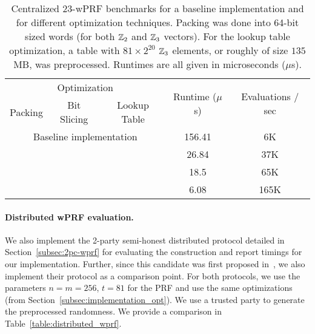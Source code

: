 \begin{table}[t]
	{
		\centering
		\begin{tabular}{|c|c|c|c|c|}
			
			\hline
			\multicolumn{3}{|c|}{Optimization} &  \multirow{2}{*}{Runtime ($\mu$s)} & \multirow{2}{*}{Evaluations / sec} \\
			Packing & Bit Slicing & Lookup Table &  & \\
			\hline\hline
			\multicolumn{3}{|c|}{Baseline implementation} & 156.41 & 6K\\
			\checkmark & & & 26.84 & 37K\\
			\checkmark & \checkmark & & 18.5 & 65K \\
			\checkmark & \checkmark & \checkmark & 6.08 & 165K \\
			\hline
		\end{tabular}
		\caption{Centralized 23-wPRF benchmarks for a baseline implementation and for different optimization techniques. Packing was done into 64-bit sized words (for both $\mathbb{Z}_2$ and $\mathbb{Z}_3$ vectors). For the lookup table optimization, a table with $81 \times 2^{20}$ $\mathbb{Z}_3$ elements, or roughly of size $135$MB, was preprocessed. Runtimes are all given in microseconds ($\mu$s).
		}
		\label{table:optimization_benchmarks}
	}
\end{table}


\paragraph{Distributed wPRF evaluation.}
We also implement the 2-party semi-honest distributed protocol detailed in Section~\ref{subsec:2pc-wprf} for evaluating the \ttwPRF construction and report timings for our implementation. Further, since this candidate was first proposed in~\cite{boneh2018-darkmatter}, we also implement their protocol as a comparison point. For both protocols, we use the parameters $n=m=256$, $t=81$ for the PRF and use the same optimizations (from Section~\ref{subsec:implementation_opt}). We use a trusted party to generate the preprocessed randomness. We provide a comparison in Table~\ref{table:distributed_wprf}.


